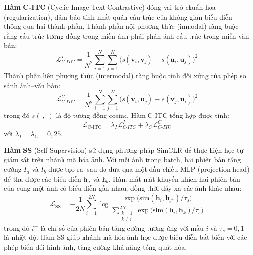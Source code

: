 \documentclass{jstarticle}
\begin{document}
\textbf{Hàm C-ITC} (Cyclic Image-Text Contrastive) đóng vai trò chuẩn hóa (regularization), đảm bảo tính nhất quán cấu trúc của không gian biểu diễn thông qua hai thành phần. Thành phần nội phương thức (inmodal) ràng buộc rằng cấu trúc tương đồng trong miền ảnh phải phản ánh cấu trúc trong miền văn bản:
\begin{equation}
    \mathcal{L}_{C\text{-}ITC}^{I} = \frac{1}{N^2} \sum_{i=1}^{N} \sum_{j=1}^{N} \big(s(\mathbf{v}_i, \mathbf{v}_j) - s(\mathbf{u}_i, \mathbf{u}_j)\big)^2
\label{eq:citc-inmodal}
\end{equation}
Thành phần liên phương thức (intermodal) ràng buộc tính đối xứng của phép so sánh ảnh–văn bản:
\begin{equation}
    \mathcal{L}_{C\text{-}ITC}^{C} = \frac{1}{N^2} \sum_{i=1}^{N} \sum_{j=1}^{N} \big(s(\mathbf{v}_i, \mathbf{u}_j) - s(\mathbf{v}_j, \mathbf{u}_i)\big)^2
\label{eq:citc-intermodal}
\end{equation}
trong đó $s(\cdot, \cdot)$ là độ tương đồng cosine. Hàm C-ITC tổng hợp được tính:
\begin{equation}
    \mathcal{L}_{\text{C-ITC}} = \lambda_I \mathcal{L}_{C\text{-}ITC}^{I} + \lambda_C \mathcal{L}_{C\text{-}ITC}^{C}
\label{eq:citc}
\end{equation}
với $\lambda_I = \lambda_C = 0{,}25$.

\textbf{Hàm SS} (Self-Supervision) sử dụng phương pháp SimCLR \cite{chen2020simple} để thực hiện học tự giám sát trên nhánh mã hóa ảnh. Với mỗi ảnh trong batch, hai phiên bản tăng cường $I_a$ và $I_b$ được tạo ra, sau đó đưa qua một đầu chiếu MLP (projection head) để thu được các biểu diễn $\mathbf{h}_a$ và $\mathbf{h}_b$. Hàm mất mát khuyến khích hai phiên bản của cùng một ảnh có biểu diễn gần nhau, đồng thời đẩy xa các ảnh khác nhau:
\begin{equation}
    \mathcal{L}_{\text{SS}} = -\frac{1}{2N}\sum_{i=1}^{2N}\log\frac{\exp\!\big(\text{sim}(\mathbf{h}_i, \mathbf{h}_{i^+}) / \tau_s\big)}{\displaystyle\sum_{\substack{k=1 \\ k \neq i}}^{2N}\exp\!\big(\text{sim}(\mathbf{h}_i, \mathbf{h}_k) / \tau_s\big)}
\label{eq:simclr}
\end{equation}
trong đó $i^+$ là chỉ số của phiên bản tăng cường tương ứng với mẫu $i$ và $\tau_s = 0{,}1$ là nhiệt độ. Hàm SS giúp nhánh mã hóa ảnh học được biểu diễn bất biến với các phép biến đổi hình ảnh, tăng cường khả năng tổng quát hóa.
\end{document}
